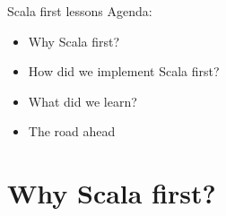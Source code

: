 \documentclass[aspectratio=169]{beamer}
\newcommand{\Section}[1]{\titleimagecolor{red}\section{#1}}
\newenvironment{Slide}[1]%
  {\begin{frame}[environment=Slide]{#1}}
  {\end{frame}}%
\begin{document}
\begin{Slide}{Scala first lessons}
Agenda:
\begin{itemize}
\item Why Scala first?
\item How did we implement Scala first?
\item What did we learn?
\item The road ahead%
\end{itemize}
\end{Slide}


\Section{Why Scala first?}

\begin{frame}[plain]
  \begin{figure}
  \centering
  \end{figure}%
  \end{frame}%
\end{document}
